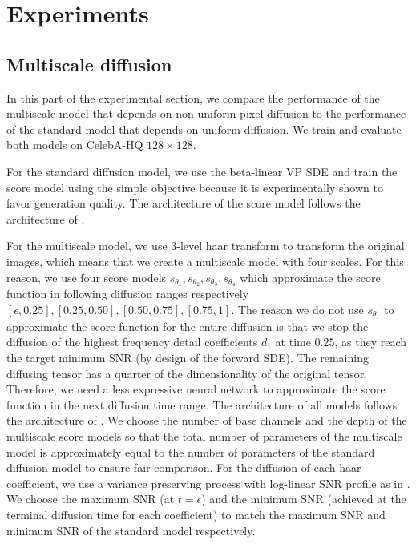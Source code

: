 \section{Experiments}
\label{ch2:sec:experiments}

\subsection{Multiscale diffusion}\label{ch2:Multiscale diffusion_experiments}


In this part of the experimental section, we compare the performance of the multiscale model that depends on non-uniform pixel diffusion to the performance of the standard model that depends on uniform diffusion. We train and evaluate both models on CelebA-HQ $128\times 128$.

For the standard diffusion model, we use the beta-linear VP SDE \cite{ho2020denoising} and train the score model using the simple objective \cite{dhariwal2021diffusion_beats_gans} because it is experimentally shown to favor generation quality. The architecture of the score model follows the architecture of \cite{dhariwal2021diffusion_beats_gans}.

For the multiscale model, we use 3-level haar transform to transform the original images, which means that we create a multiscale model with four scales. For this reason, we use four score models $s_{\theta_1},s_{\theta_2},s_{\theta_3},s_{\theta_4}$ which approximate the score function in following diffusion ranges respectively $[\epsilon, 0.25], [0.25, 0.50], [0.50, 0.75], [0.75, 1]$. The reason we do not use $s_{\theta_1}$ to approximate the score function for the entire diffusion is that we stop the diffusion of the highest frequency detail coefficients $d_1$ at time $0.25$, as they reach the target minimum SNR (by design of the forward SDE). The remaining diffusing tensor has a quarter of the dimensionality of the original tensor. Therefore, we need a less expressive neural network to approximate the score function in the next diffusion time range. The architecture of all models follows the architecture of \cite{dhariwal2021diffusion_beats_gans}. We choose the number of base channels and the depth of the multiscale score models so that the total number of parameters of the multiscale model is approximately equal to the number of parameters of the standard diffusion model to ensure fair comparison. For the diffusion of each haar coefficient, we use a variance preserving process with log-linear SNR profile as in \cite{kingmaVDM}. We choose the maximum SNR (at $t=\epsilon$) and the minimum SNR (achieved at the terminal diffusion time for each coefficient) to match the maximum SNR and minimum SNR of the standard model respectively.

